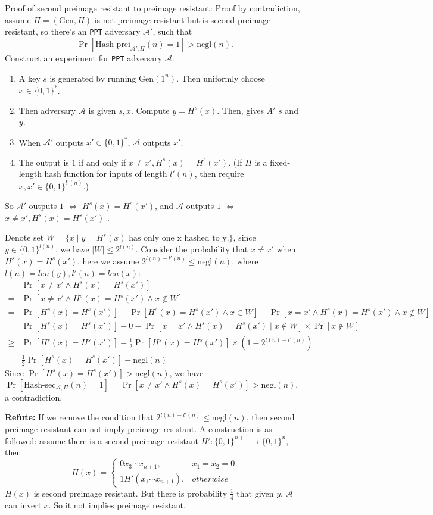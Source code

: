 \documentclass[a4paper]{article}
\newcommand{\negl}{\text{negl}}
\newcommand{\Gen}{\text{Gen}}
\newcommand{\hashsec}{\text{Hash-sec}}
\newcommand{\hashprei}{\text{Hash-prei}}
\newcommand{\A}{\mathcal{A}}
\newenvironment{problem}[2][Problem]{\begin{trivlist}
\item[\hskip \labelsep {\bfseries #1}\hskip \labelsep {\bfseries #2.}]}{\end{trivlist}}
\begin{document}
\begin{problem}{5.1}
Proof of second preimage resistant to preimage resistant: Proof by contradiction, assume $\Pi=(\Gen, H)$ is not preimage resistant but is second preimage resistant, so there's an \texttt{PPT} adversary $\A'$, such that \[\Pr[\hashprei_{\A',\Pi}(n)=1]>\negl(n).\]
Construct an experiment for \texttt{PPT} adversary $\A$:
\begin{enumerate}
    \item A key $s$ is generated by running $\Gen(1^n)$. Then uniformly choose $x\in\{0,1\}^*$.
    \item Then adversary $\A$ is given $s,x$. Compute $y=H^s(x)$. Then, gives $A'$ $s$ and $y$.
    \item When $\A'$ outputs $x'\in\{0,1\}^*$, $\A$ outputs $x'$.
    \item The output is $1$ if and only if $x\ne x', H^s(x)=H^s(x')$.
    (If $\Pi$ is a fixed-length hash function for inputs of length $l'(n)$, then require $x,x'\in\{0,1\}^{l'(n)}$.)
\end{enumerate}
So $\A'$ outputs $1$ $\Leftrightarrow$ $H^s(x)=H^s(x')$, and $\A$ outputs $1$ $\Leftrightarrow$ $x\ne x',H^s(x)=H^s(x')$ .\par
Denote set $W=\{x\mid y=H^s(x)\text{ has only one x hashed to y.}\}$, since $y\in\{0,1\}^{l(n)}$, we have $|W|\le 2^{l(n)}$.
Consider the probability that $x\ne x'$ when $H^s(x)=H^s(x')$, here we assume $2^{l(n)-l'(n)}\le\negl(n)$, where $l(n)=len(y),l'(n)=len(x)$:
\begin{align*}
    &\Pr[x\ne x'\land H^s(x)=H^s(x')]\\
    =&\Pr[x\ne x'\land H^s(x)=H^s(x')\land x\not\in W]\\
    =&\Pr[H^s(x)=H^s(x')]-\Pr[H^s(x)=H^s(x')\land x\in W]-\Pr[x=x'\land H^s(x)=H^s(x')\land x\not\in W]\\
    =&\Pr[H^s(x)=H^s(x')]-0-\Pr[x=x'\land H^s(x)=H^s(x')\mid x\not\in W ]\times\Pr[x\not\in W]\\
    \ge&\Pr[H^s(x)=H^s(x')]-\frac12\Pr[H^s(x)=H^s(x')]\times(1-2^{l(n)-l'(n)})\\
    =&\frac12\Pr[H^s(x)=H^s(x')]-\negl(n)
\end{align*}
Since $\Pr[H^s(x)=H^s(x')]>\negl(n)$, we have $\Pr[\hashsec_{\A,\Pi}(n)=1]=\Pr[x\ne x'\land H^s(x)=H^s(x')]>\negl(n),$ a contradiction.\par\vspace{2ex}
\textbf{Refute:} If we remove the condition that $2^{l(n)-l'(n)}\le\negl(n)$, then second preimage resistant can not imply preimage resistant. A construction is as followed: assume there is a second preimage resistant $H':\{0,1\}^{n+1}\rightarrow\{0,1\}^n$, then 
		\begin{equation*}  
			H(x)= \begin{cases}
					0x_3\cdots x_{n+1}, & x_1=x_2=0 \\  
					1H'(x_1\cdots x_{n+1}), & otherwise  
				\end{cases} 
		\end{equation*}
$H(x)$ is second preimage resistant. But there is probability $\frac14$ that given $y$, $\A$ can invert $x$. So it not implies preimage resistant.
\end{problem}
\end{document}
